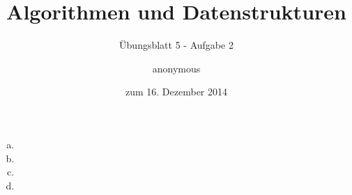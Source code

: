 \documentclass[a4paper]{scrartcl}
\title{Algorithmen und Datenstrukturen}
\subtitle{Übungsblatt 5 - Aufgabe 2}
\author{
    anonymous
}
\date{zum 16. Dezember 2014}
\begin{document}
\maketitle

\begin{enumerate}[(a)]
    \item

    \item

    \item

    \item

\end{enumerate}
\end{document}
